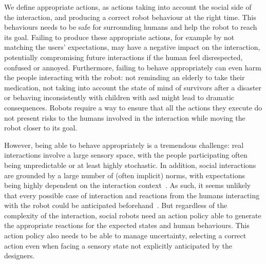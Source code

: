     We define appropriate actions, as actions taking into account the social side of the interaction, and producing a correct robot behaviour at the right time. This behaviours needs to be safe for surrounding humans and help the robot to reach its goal. Failing to produce these appropriate actions, for example by not matching the users' expectations, may have a negative impact on the interaction, potentially compromising future interactions if the human feel disrespected, confused or annoyed. Furthermore, failing to behave appropriately can even harm the people interacting with the robot: not reminding an elderly to take their medication, not taking into account the state of mind of survivors after a disaster or behaving inconsistently with children with \gls{asd} might lead to dramatic consequences. Robots require a way to ensure that all the actions they execute do not present risks to the humans involved in the interaction while moving the robot closer to its goal.
	
    
    However, being able to behave appropriately is a tremendous challenge: real interactions involve a large sensory space, with the people participating often being unpredictable or at least highly stochastic. In addition, social interactions are grounded by a large number of (often implicit) norms, with expectations being highly dependent on the interaction context~\citep{sherif1936psychology}. As such, it seems unlikely that every possible case of interaction and reactions from the humans interacting with the robot could be anticipated beforehand~\citep{dautenhahn2004robots}. But regardless of the complexity of the interaction, social robots need an action policy able to generate the appropriate reactions for the expected states and human behaviours. This action policy also needs to be able to manage uncertainty, selecting a correct action even when facing a sensory state not explicitly anticipated by the designers.
    
